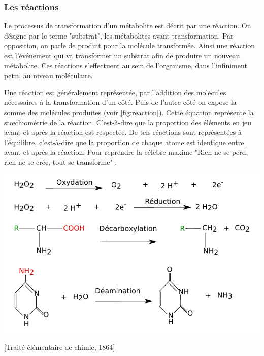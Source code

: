 \begin{refsegment}

	\subsubsection{Les réactions}
	Le processus de transformation d’un métabolite est décrit par une réaction. On désigne par le terme "substrat", les métabolites avant transformation. Par opposition, on parle de produit pour la molécule transformée. Ainsi une réaction est l'événement qui va transformer un substrat afin de produire un nouveau métabolite. Ces réactions s'effectuent au sein de l'organisme, dans l'infiniment petit, au niveau moléculaire.
    
    Une réaction est généralement représentée, par l’addition des molécules nécessaires à la transformation d’un côté. Puis de l’autre côté on expose la somme des molécules produites (voir \cref{fig:reaction}). Cette équation  représente la stœchiométrie de la réaction. C’est-à-dire que la proportion des éléments en jeu avant et après la réaction est respectée. De tels réactions sont représentées à l'équilibre, c'est-à-dire que la proportion de chaque atome est identique entre avant et après la réaction. Pour reprendre la célèbre maxime "Rien ne se perd, rien ne se crée, tout se transforme" .
    
    \begin{shadedfigure}[H]
        \centering
        \includegraphics[width=\textwidth]{img/equation_reaction.pdf}
        \caption{Représentation de réaction sous leur forme "équation-bilan" .}
        \label{fig:reaction}
    \end{shadedfigure}
    
    [Traité élémentaire de chimie, 1864]
    

\end{refsegment}

